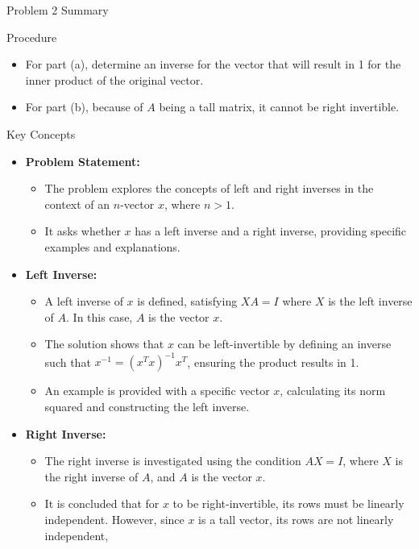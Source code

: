 \begin{summary}{Problem 2 Summary}
    \begin{statement}{Procedure}
        \begin{itemize}
            \item For part (a), determine an inverse for the vector that will result in 1 for the inner product of the original vector.
            \item For part (b), because of $A$ being a tall matrix, it cannot be right invertible.
        \end{itemize}
    \end{statement}
    \begin{statement}{Key Concepts}
        \begin{itemize}
            \item \textbf{Problem Statement:}
            \begin{itemize}
                \item The problem explores the concepts of left and right inverses in the context of an $n$-vector $x$, where $n > 1$.
                \item It asks whether $x$ has a left inverse and a right inverse, providing specific examples and explanations.
            \end{itemize}
            \item \textbf{Left Inverse:}
            \begin{itemize}
                \item A left inverse of $x$ is defined, satisfying $XA = I$ where $X$ is the left inverse of $A$. In this case, $A$ is the vector $x$.
                \item The solution shows that $x$ can be left-invertible by defining an inverse such that $x^{-1} = (x^T x)^{-1}x^T$, ensuring the product results in 1.
                \item An example is provided with a specific vector $x$, calculating its norm squared and constructing the left inverse.
            \end{itemize}
            \item \textbf{Right Inverse:}
            \begin{itemize}
                \item The right inverse is investigated using the condition $AX = I$, where $X$ is the right inverse of $A$, and $A$ is the vector $x$.
                \item It is concluded that for $x$ to be right-invertible, its rows must be linearly independent. However, since $x$ is a tall vector, its rows are not linearly independent, 

\end{itemize}
\end{itemize}
\end{statement}
\end{summary}
